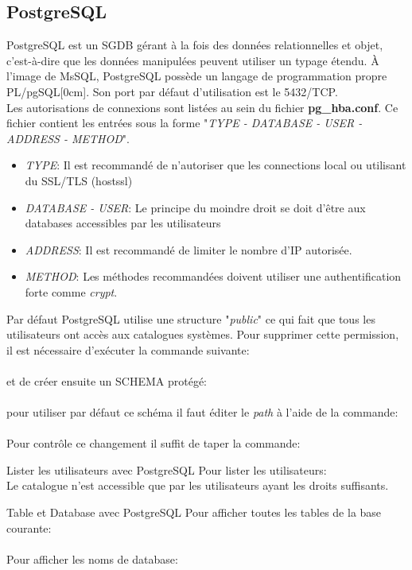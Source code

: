 \documentclass[twoside,a4paper,12pt,titlepage]{book}
\newcommand{\MarginPar}[2]{\marginnote{\scriptsize #1}[#2]}
\begin{document}
\subsection{PostgreSQL}
PostgreSQL est un \gls{SGDB} gérant à la fois des données relationnelles et objet, c'est-à-dire que les données manipulées peuvent utiliser un typage étendu. \`A l'image de MsSQL, PostgreSQL possède un langage de programmation propre PL/pgSQL\MarginPar{\textbf{PL/pgSQL}}{0cm}. Son port par défaut d'utilisation est le 5432/TCP.\\
Les autorisations de connexions sont listées au sein du fichier \textbf{pg\_hba.conf}. Ce fichier contient les entrées sous la forme "\textit{TYPE - DATABASE - USER - ADDRESS - METHOD}".\begin{itemize}
\item \textit{TYPE}: Il est recommandé de n'autoriser que les connections local ou utilisant du SSL/TLS (hostssl)
\item \textit{DATABASE - USER}: Le principe du moindre droit se doit d'être aux databases accessibles par les utilisateurs
\item \textit{ADDRESS}: Il est recommandé de limiter le nombre d'IP autorisée.
\item \textit{METHOD}: Les méthodes recommandées doivent utiliser une authentification forte comme \textit{crypt}.
\end{itemize}
Par défaut PostgreSQL utilise une structure "\textit{public}" ce qui fait que tous les utilisateurs ont accès aux catalogues systèmes. Pour supprimer cette permission, il est nécessaire d'exécuter la commande suivante:\\
\\
et de créer ensuite un SCHEMA protégé:\\
\\
pour utiliser par défaut ce schéma il faut éditer le \textit{path} à l'aide de la commande:\\
\\
Pour contrôle ce changement il suffit de taper la commande:\\

\begin{FlagConsole}{Lister les utilisateurs avec PostgreSQL}
	Pour lister les utilisateurs:
	\\
	Le catalogue n'est accessible que par les utilisateurs ayant les droits suffisants.\\
\end{FlagConsole}
\begin{FlagConsole}{Table et Database avec PostgreSQL}
	Pour afficher toutes les tables de la base courante:\\
	\\
	Pour afficher les noms de database:\\
\end{FlagConsole}
\end{document}
